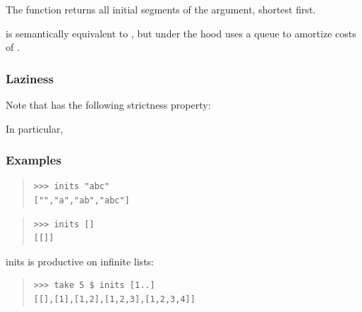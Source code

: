\begin{haddockdesc}
\item[\begin{tabular}{@{}l}
inits :: {\char 91}a{\char 93} -> {\char 91}{\char 91}a{\char 93}{\char 93}
\end{tabular}]
{\haddockbegindoc
The  function returns all initial segments of the argument,
 shortest first.\par
{} is semantically equivalent to ,
 but under the hood uses a queue to amortize costs of .\par
\subsubsection*{\textbf{Laziness}}
Note that  has the following strictness property:
 \par
In particular,
 \par
\subsubsection*{\textbf{Examples}}
\begin{quote}
{\haddockverb\begin{verbatim}
>>> inits "abc"
["","a","ab","abc"]

\end{verbatim}}
\end{quote}
\begin{quote}
{\haddockverb\begin{verbatim}
>>> inits []
[[]]

\end{verbatim}}
\end{quote}
inits is productive on infinite lists:\par
\begin{quote}
{\haddockverb\begin{verbatim}
>>> take 5 $ inits [1..]
[[],[1],[1,2],[1,2,3],[1,2,3,4]]

\end{verbatim}}
\end{quote}}
\end{haddockdesc}

